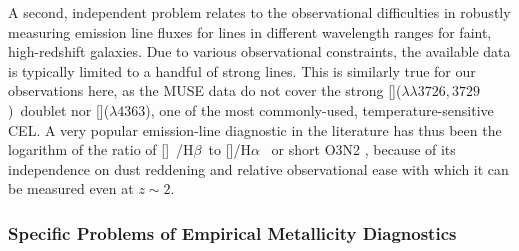 \documentclass[traditabstract, referee]{aa}
\newcommand{\hb}{H$\beta$}
\newcommand{\ha}{H$\alpha$}
\newcommand{\oii}{[\ion{O}{ii}]}
\newcommand{\oiii}{[\ion{O}{iii}]}
\newcommand{\nii}{[\ion{N}{ii}]}
\begin{document}
A second, independent problem relates to the observational difficulties in robustly measuring emission line fluxes for lines in different wavelength ranges for faint, high-redshift galaxies. Due to various observational constraints, the available data is typically limited to a handful of strong lines. This is similarly true for our observations here, as the MUSE data do not cover the strong \oii($\lambda\lambda3726,3729$)~doublet nor \oiii($\lambda 4363$), one of the most commonly-used, temperature-sensitive CEL. A very popular emission-line diagnostic in the literature has thus been the logarithm of the ratio of \oiii~/\hb~to \nii/\ha~ or short O3N2 \citep[e.g.][]{2004MNRAS.348L..59P, 2013A&A...559A.114M}, because of its independence on dust reddening and relative observational ease with which it can be measured even at $z\sim 2$.

\subsubsection{Specific Problems of Empirical Metallicity Diagnostics}
\end{document}
